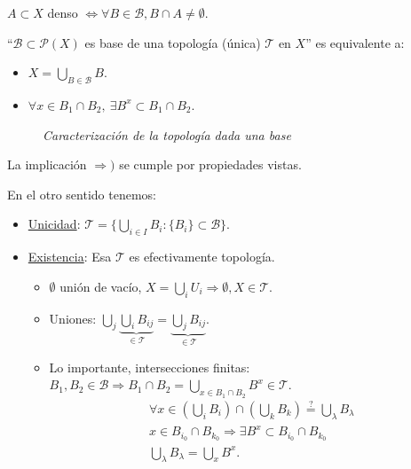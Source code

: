 \begin{il}
$A \subset X$ denso $\Leftrightarrow \forall B \in \mathcal{B}, B \cap A \neq \emptyset$.
\end{il}

\begin{prop}
``$\mathcal{B} \subset \mathcal{P} \left( X \right)$ es base de una topología (única) $\mathcal{T}$ en $X$'' es equivalente a: 
\begin{itemize}
    \item $X = \bigcup_{B \in \mathcal{B}} B$.
    \item $\forall x \in B_1 \cap B_2,\ \exists B^x \subset B_1 \cap B_2$.
\end{itemize}
\begin{figure}[H]
    \centering
    \caption{\textit{Caracterización de la topología dada una base}}
    \label{fig:caracterización-de-la-topología-dada-una-base}
\end{figure}

\end{prop}
\begin{demo}
La implicación $\Rightarrow)$ se cumple por propiedades vistas.

En el otro sentido tenemos:
\begin{itemize}
    \item \underline{Unicidad}: $\mathcal{T} = \{\bigcup_{i \in  I} B_i: \{B_i\} \subset \mathcal{B}\}$.
    \item \underline{Existencia}: Esa $\mathcal{T}$ es efectivamente topología. 
        \begin{itemize}
            \item $\emptyset$ unión de vacío, $X = \bigcup_{i} U_i \Rightarrow \emptyset, X \in \mathcal{T}$.
            \item Uniones: $\bigcup_{j} \underbrace{\bigcup_{i} B_{ij}}_{\in \mathcal{T}} = \underbrace{\bigcup_{j} B_{ij}}_{\in \mathcal{T}}$. 
            \item Lo importante, intersecciones finitas: $B_1, B_2 \in \mathcal{B} \Rightarrow B_1 \cap B_2 = \bigcup_{x \in B_1 \cap B_2} B^x \in \mathcal{T}$.
            \begin{gather*}
                \forall x \in \left( \bigcup_{i} B_i \right) \cap \left( \bigcup_{k} B_k \right) \stackrel{?}{=} \bigcup_{\lambda} B_{\lambda}\\
                x \in B_{i_0} \cap B_{k_0} \Rightarrow \exists B^x \subset B_{i_0} \cap B_{k_0} \\
                \bigcup_{\lambda} B_{\lambda} = \bigcup_{x} B^x
            .\end{gather*}
        \end{itemize}
\end{itemize}
\end{demo}

